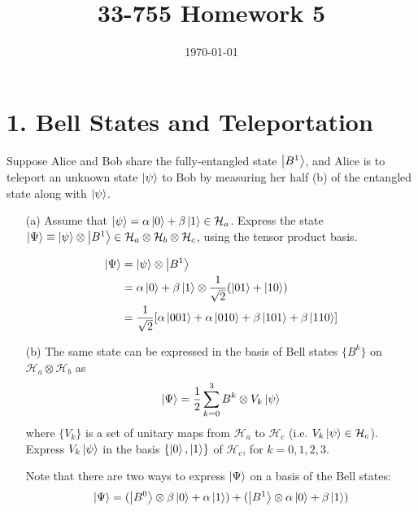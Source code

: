 \documentclass[a4paper,twoside]{article}
\title{33-755 Homework 5}
\date{\today}
\begin{document}
\maketitle

\section*{1. Bell States and Teleportation}

Suppose Alice and Bob share the fully-entangled state $ \ket{B^1} $, and Alice is to teleport an unknown state $ \ket{\psi} $ to Bob by measuring her half (b) of the entangled state along with $ \ket{\psi} $.

\begin{itemize}
    \item[(a)] Assume that $ \ket{\psi} = \alpha \ket{0} + \beta \ket{1} \in \mathcal{H}_{a} $. Express the state $ \ket{\Psi} \equiv \ket{\psi} \otimes \ket{B^1} \in \mathcal{H}_{a} \otimes \mathcal{H}_{b} \otimes \mathcal{H}_{c} $, using the tensor product basis.
        \begin{tcolorbox}[breakable]
            \begin{align}
                \ket{\Psi} &= \ket{\psi} \otimes \ket{B^1}\\
                &= \alpha \ket{0} + \beta \ket{1} \otimes \frac{1}{\sqrt{2}} ( \ket{01} + \ket{10})\\
                &= \frac{1}{\sqrt{2}} [\alpha \ket{001} + \alpha \ket{010} + \beta \ket{101} + \beta \ket{110}]
            \end{align}
        \end{tcolorbox}
    \item[(b)] The same state can be expressed in the basis of Bell states $ \{B^k\} $ on $ \mathcal{H}_{a} \otimes \mathcal{H}_{b} $ as
        \begin{equation}
            \ket{\Psi} = \frac{1}{2} \sum_{k=0}^{3} B^k \otimes V_k \ket{\psi} 
        \end{equation}
        where $ \{V_k\} $ is a set of unitary maps from $ \mathcal{H}_{a} $ to $ \mathcal{H}_{c} $ (i.e. $ V_k \ket{\psi} \in \mathcal{H}_{c} $). Express $ V_k \ket{\psi} $ in the basis $ \{\ket{0}, \ket{1}\} $ of $ \mathcal{H}_{c} $, for $ k = 0,1,2,3 $.
        \begin{tcolorbox}[breakable]
            Note that there are two ways to express $ \ket{\Psi} $ on a basis of the Bell states:
            \begin{equation}
                \ket{\Psi} = (\ket{B^0} \otimes \beta \ket{0} + \alpha \ket{1}) + (\ket{B^1} \otimes \alpha \ket{0} + \beta \ket{1})

\end{equation}
\end{tcolorbox}
\end{itemize}
\end{document}
